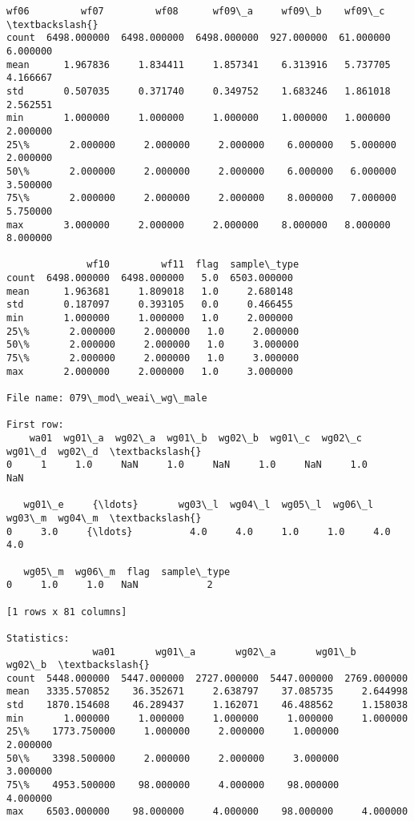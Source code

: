 \documentclass[11pt]{article}
\begin{document}
\begin{Verbatim}[commandchars=\\\{\}]
              wf06         wf07         wf08      wf09\_a     wf09\_b    wf09\_c  \textbackslash{}
count  6498.000000  6498.000000  6498.000000  927.000000  61.000000  6.000000   
mean      1.967836     1.834411     1.857341    6.313916   5.737705  4.166667   
std       0.507035     0.371740     0.349752    1.683246   1.861018  2.562551   
min       1.000000     1.000000     1.000000    1.000000   1.000000  2.000000   
25\%       2.000000     2.000000     2.000000    6.000000   5.000000  2.000000   
50\%       2.000000     2.000000     2.000000    6.000000   6.000000  3.500000   
75\%       2.000000     2.000000     2.000000    8.000000   7.000000  5.750000   
max       3.000000     2.000000     2.000000    8.000000   8.000000  8.000000   

              wf10         wf11  flag  sample\_type  
count  6498.000000  6498.000000   5.0  6503.000000  
mean      1.963681     1.809018   1.0     2.680148  
std       0.187097     0.393105   0.0     0.466455  
min       1.000000     1.000000   1.0     2.000000  
25\%       2.000000     2.000000   1.0     2.000000  
50\%       2.000000     2.000000   1.0     3.000000  
75\%       2.000000     2.000000   1.0     3.000000  
max       2.000000     2.000000   1.0     3.000000  

File name: 079\_mod\_weai\_wg\_male

First row: 
    wa01  wg01\_a  wg02\_a  wg01\_b  wg02\_b  wg01\_c  wg02\_c  wg01\_d  wg02\_d  \textbackslash{}
0     1     1.0     NaN     1.0     NaN     1.0     NaN     1.0     NaN   

   wg01\_e     {\ldots}       wg03\_l  wg04\_l  wg05\_l  wg06\_l  wg03\_m  wg04\_m  \textbackslash{}
0     3.0     {\ldots}          4.0     4.0     1.0     1.0     4.0     4.0   

   wg05\_m  wg06\_m  flag  sample\_type  
0     1.0     1.0   NaN            2  

[1 rows x 81 columns]

Statistics: 
               wa01       wg01\_a       wg02\_a       wg01\_b       wg02\_b  \textbackslash{}
count  5448.000000  5447.000000  2727.000000  5447.000000  2769.000000   
mean   3335.570852    36.352671     2.638797    37.085735     2.644998   
std    1870.154608    46.289437     1.162071    46.488562     1.158038   
min       1.000000     1.000000     1.000000     1.000000     1.000000   
25\%    1773.750000     1.000000     2.000000     1.000000     2.000000   
50\%    3398.500000     2.000000     2.000000     3.000000     3.000000   
75\%    4953.500000    98.000000     4.000000    98.000000     4.000000   
max    6503.000000    98.000000     4.000000    98.000000     4.000000   


\end{Verbatim}
\end{document}
